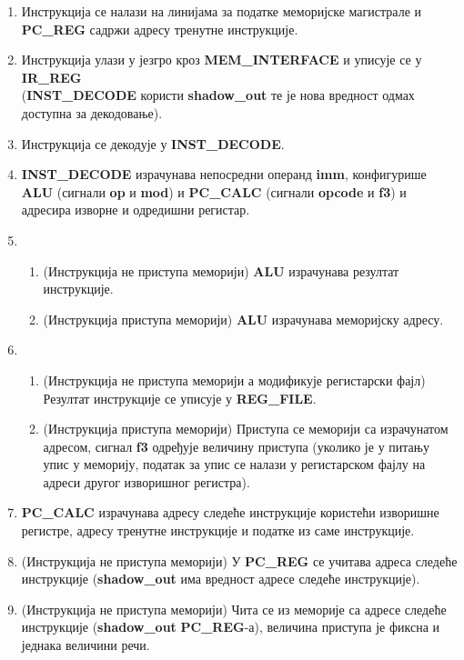 \begin{enumerate}
	\item Инструкција се налази на линијама за податке меморијске магистрале и \textbf{PC\_REG} садржи адресу тренутне инструкције. \label{itemone}
	\item Инструкција улази у језгро кроз \textbf{MEM\_INTERFACE} и уписује се у \textbf{IR\_REG} \\(\textbf{INST\_DECODE} користи \textbf{shadow\_out} те је нова вредност одмах доступна за декодовање).
	\item Инструкција се декодује у \textbf{INST\_DECODE}.
	\item \textbf{INST\_DECODE} израчунава непосредни операнд \textbf{imm}, конфигурише \textbf{ALU} (сигнали \textbf{op} и \textbf{mod}) и \textbf{PC\_CALC} (сигнали \textbf{opcode} и \textbf{f3}) и адресира изворне и одредишни регистар.
	\item
	\begin{enumerate}	
	\item (Инструкција не приступа меморији) \textbf{ALU} израчунава резултат инструкције.
	\item (Инструкција приступа меморији) \textbf{ALU} израчунава меморијску адресу.
	\end{enumerate}
	\item
	\begin{enumerate}
	\item (Инструкција не приступа меморији а модификује регистарски фајл) Резултат инструкције се уписује у \textbf{REG\_FILE}.
	\item (Инструкција приступа меморији) Приступа се меморији са израчунатом адресом, сигнал \textbf{f3} одређује величину приступа (уколико је у питању упис у меморију, податак за упис се налази у регистарском фајлу на адреси другог изворишног регистра).
	\end{enumerate}
	\item \textbf{PC\_CALC} израчунава адресу следеће инструкције користећи изворишне регистре, адресу тренутне инструкције и податке из саме инструкције.
	\item (Инструкција не приступа меморији) У \textbf{PC\_REG} се учитава адреса следеће инструкције (\textbf{shadow\_out} има вредност адресе следеће инструкције).
	\item (Инструкција не приступа меморији) Чита се из меморије са адресе следеће инструкције (\textbf{shadow\_out} \textbf{PC\_REG}-а), величина приступа је фиксна и једнака величини речи.
\end{enumerate}

